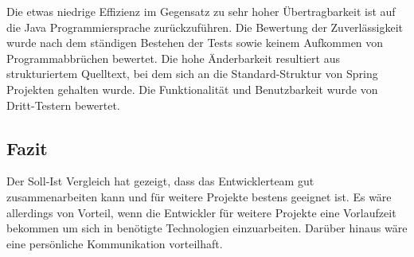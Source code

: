 Die etwas niedrige Effizienz im Gegensatz zu sehr hoher Übertragbarkeit ist auf die Java Programmiersprache zurückzuführen.
Die Bewertung der Zuverlässigkeit wurde nach dem ständigen Bestehen der Tests sowie keinem Aufkommen von Programmabbrüchen bewertet.
Die hohe Änderbarkeit resultiert aus strukturiertem Quelltext, bei dem sich an die Standard-Struktur von Spring Projekten gehalten wurde.
Die Funktionalität und Benutzbarkeit wurde von Dritt-Testern bewertet.

\subsection{Fazit}
Der Soll-Ist Vergleich hat gezeigt, dass das Entwicklerteam gut zusammenarbeiten kann und für weitere Projekte bestens geeignet ist.
Es wäre allerdings von Vorteil, wenn die Entwickler für weitere Projekte eine Vorlaufzeit bekommen um sich in benötigte
Technologien einzuarbeiten. Darüber hinaus wäre eine persönliche Kommunikation vorteilhaft.







